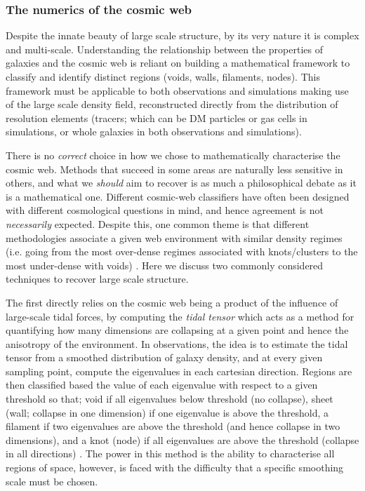 \subsubsection{The numerics of the cosmic web}
Despite the innate beauty of large scale structure, by its very nature it is complex and multi-scale. Understanding the relationship between the properties of galaxies and the cosmic web is reliant on building a mathematical framework to classify and identify distinct regions (voids, walls, filaments, nodes). This framework must be applicable to both observations and simulations making use of the large scale density field, reconstructed directly from the distribution of resolution elements (tracers; which can be DM particles or gas cells in simulations, or whole galaxies in both observations and simulations). 

There is no \textit{correct} choice in how we chose to mathematically characterise the cosmic web. Methods that succeed in some areas are naturally less sensitive in others, and what we \textit{should} aim to recover is as much a philosophical debate as it is a mathematical one. Different cosmic-web classifiers have often been designed with different cosmological questions in mind, and hence agreement is not \textit{necessarily} expected. Despite this, one common theme is that different methodologies associate a given web environment with similar density regimes (i.e. going from the most over-dense regimes associated with knots/clusters to the most under-dense with voids) \citep{libeskind2018}. Here we discuss two commonly considered techniques to recover large scale structure.

The first directly relies on the cosmic web being a product of the influence of large-scale tidal forces, by computing the \textit{tidal tensor} which acts as a method for quantifying how many dimensions are collapsing at a given point and hence the anisotropy of the environment. In observations, the idea is to estimate the tidal tensor from a smoothed distribution of galaxy density, and at every given sampling point, compute the eigenvalues in each cartesian direction. Regions are then classified based the value of each eigenvalue with respect to a given threshold so that; void if all eigenvalues below threshold (no collapse), sheet (wall; collapse in one dimension) if one eigenvalue is above the threshold, a filament if two eigenvalues are above the threshold (and hence collapse in two dimensions), and a knot (node) if all eigenvalues are above the threshold (collapse in all directions) \citep[e.g.][]{eardley2015}. The power in this method is the ability to characterise all regions of space, however, is faced with the difficulty that a specific smoothing scale must be chosen.

